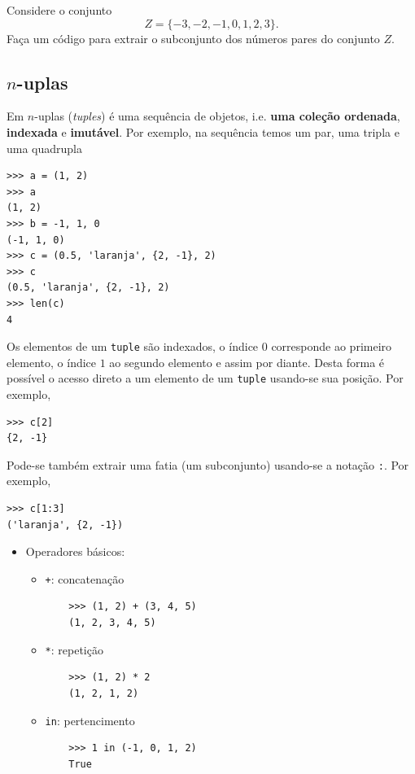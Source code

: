 \documentclass[12pt]{article}
\begin{document}
\begin{exr}
  Considere o conjunto
  \begin{equation}
    Z = \{-3, -2, -1, 0, 1, 2, 3\}.
  \end{equation}
  Faça um código {\python} para extrair o subconjunto dos números pares do conjunto $Z$.
\end{exr}

\subsection{$n$-uplas}

Em {\python} $n$-uplas ({\it tuples}) é uma sequência de objetos, i.e. {\bf uma coleção ordenada}, {\bf indexada} e {\bf imutável}. Por exemplo, na sequência temos um par, uma tripla e uma quadrupla
\begin{lstlisting}
>>> a = (1, 2)
>>> a
(1, 2)
>>> b = -1, 1, 0
(-1, 1, 0)
>>> c = (0.5, 'laranja', {2, -1}, 2)
>>> c
(0.5, 'laranja', {2, -1}, 2)
>>> len(c)
4
\end{lstlisting}

Os elementos de um \lstinline+tuple+ são indexados, o índice $0$ corresponde ao primeiro elemento, o índice $1$ ao segundo elemento e assim por diante. Desta forma é possível o acesso direto a um elemento de um \lstinline+tuple+ usando-se sua posição. Por exemplo,
\begin{lstlisting}
>>> c[2]
{2, -1}
\end{lstlisting}
Pode-se também extrair uma fatia (um subconjunto) usando-se a notação \lstinline+:+. Por exemplo,
\begin{lstlisting}
>>> c[1:3]
('laranja', {2, -1})
\end{lstlisting}

\begin{itemize}
\item Operadores básicos:
  \begin{itemize}
  \item[] \lstinline-+-: concatenação
    \begin{lstlisting}
    >>> (1, 2) + (3, 4, 5)
    (1, 2, 3, 4, 5)
    \end{lstlisting}
  \item[] \lstinline+*+: repetição
    \begin{lstlisting}
    >>> (1, 2) * 2
    (1, 2, 1, 2)
    \end{lstlisting}
  \item[] \lstinline+in+: pertencimento
    \begin{lstlisting}
    >>> 1 in (-1, 0, 1, 2)
    True
    \end{lstlisting}
  \end{itemize}
\end{itemize}
\end{document}
